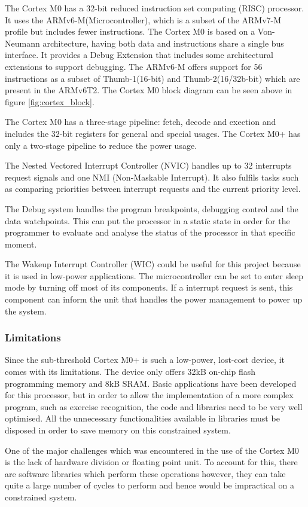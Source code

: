 The Cortex M0 has a 32-bit reduced instruction set computing (RISC) processor. It uses the ARMv6-M(Microcontroller), which is a subset of the ARMv7-M profile but includes fewer instructions. The Cortex M0 is based on a Von-Neumann architecture, having both data and instructions share a single bus interface. It provides a Debug Extension that includes some architectural extensions to support debugging. The ARMv6-M offers support for 56 instructions as a subset of  Thumb-1(16-bit) and Thumb-2(16/32b-bit) which are present in the ARMv6T2. The Cortex M0 block diagram can be seen above in figure \ref{fig:cortex_block}. 

The Cortex M0 has a three-stage pipeline: fetch, decode and exection and includes the 32-bit registers for general and special usages. The Cortex M0+ has only a two-stage pipeline to reduce the power usage.

The Nested Vectored Interrupt Controller (NVIC) handles up to 32 interrupts request signals and one NMI (Non-Maskable Interrupt). It also fulfils tasks such as comparing priorities between  interrupt requests and the current priority level. 

The Debug system handles the program breakpoints, debugging control and the data watchpoints. This can put the processor in a  static state in order for the programmer to evaluate and analyse the status of the processor in that specific moment.

The Wakeup Interrupt Controller (WIC) could be useful for this project because it is used in low-power applications. The microcontroller can be set to enter sleep mode by turning off most of its components. If a interrupt request is sent, this component can inform the unit that handles the power management to power up the system.

\subsubsection{Limitations \label{sec:cortex-limitations}}

Since the sub-threshold Cortex M0+ is such a low-power, lost-cost device, it comes with its limitations. The device only offers 32kB on-chip flash programming memory and 8kB SRAM. Basic applications have been developed for this processor, but in order to allow the implementation of a more complex program, such as exercise recognition, the code and libraries need to be very well optimised. All the unnecessary functionalities available in libraries must be disposed in order to save memory on this constrained system.

One of the major challenges which was encountered in the use of the Cortex M0 is the lack of hardware division or floating point unit. To account for this, there are software libraries which perform these operations however, they can take quite a large number of cycles to perform and hence would be impractical on a constrained system.
